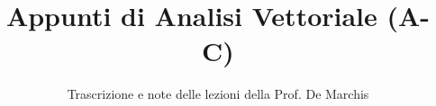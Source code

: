 \documentclass[a4paper,12pt]{article}
\title{Appunti di Analisi Vettoriale (A-C)}
\author{Trascrizione e note delle lezioni della Prof. De Marchis}
\date{}
\begin{document}
\maketitle
\projectintro
\tableofcontents
\newpage

\end{document}

